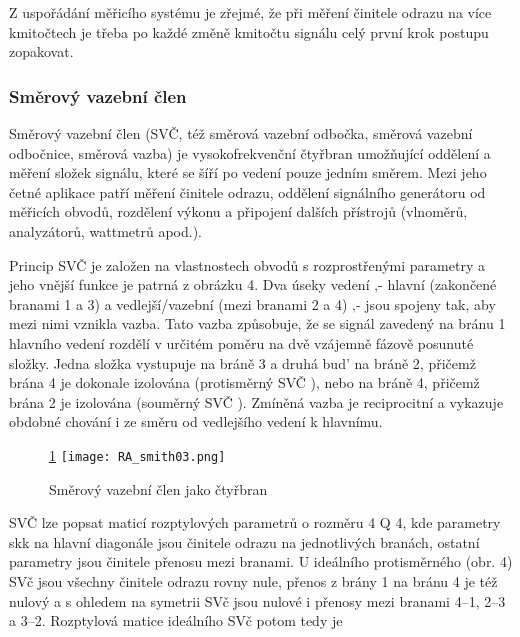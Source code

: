         Z uspořádání měřicího systému je zřejmé, že při měření činitele odrazu na více kmitočtech je třeba po 
        každé změně kmitočtu signálu celý první krok postupu zopakovat.
  
      \subsubsection{Směrový vazební člen}     
        Směrový vazební člen (SVČ, též směrová vazební odbočka, směrová vazební odbočnice, směrová vazba) je 
        vysokofrekvenční čtyřbran umožňující oddělení a měření složek signálu, které se šíří po vedení pouze 
        jedním směrem. Mezi jeho četné aplikace patří měření činitele odrazu, oddělení signálního generátoru 
        od měřicích obvodů, rozdělení výkonu a připojení dalších přístrojů (vlnoměrů, analyzátorů, wattmetrů 
        apod.).
  
        Princip SVČ je založen na vlastnostech obvodů s rozprostřenými parametry a jeho vnější funkce je 
        patrná z obrázku 4. Dva úseky vedení ‚- hlavní (zakončené branami 1 a 3) a vedlejší/vazební (mezi 
        branami 2 a 4) ‚- jsou spojeny tak, aby mezi nimi vznikla vazba. Tato vazba způsobuje, že se signál 
        zavedený na bránu 1 hlavního vedení rozdělí v určitém poměru na dvě vzájemně fázově posunuté složky. 
        Jedna složka vystupuje na bráně 3 a druhá bud’ na bráně 2, přičemž brána 4 je dokonale izolována 
        (protisměrný SVČ ), nebo na bráně 4, přičemž brána 2 je izolována (souměrný SVČ ). Zmíněná vazba je 
        reciprocitní a vykazuje obdobné chování i ze směru od vedlejšího vedení k hlavnímu.      
  
        \begin{figure}\ref{fyz:fig_RA_smith03} 
          \centering
          \texttt{[image: RA\_smith03.png]}
          \caption{Směrový vazební člen jako čtyřbran}
          \label{fyz:fig_RA_smith03} 
        \end{figure}
  
        SVČ lze popsat maticí rozptylových parametrů o rozměru 4 Q 4, kde parametry skk na hlavní diagonále 
        jsou činitele odrazu na jednotlivých branách, ostatní parametry jsou činitele přenosu mezi branami. U 
        ideálního protisměrného (obr. 4) SVč jsou všechny činitele odrazu rovny nule, přenos z brány 1 na 
        bránu 4 je též nulový a s ohledem na symetrii SVč jsou nulové i přenosy mezi branami 4–1, 2–3 a 3–2. 
        Rozptylová matice ideálního SVč potom tedy je
  
